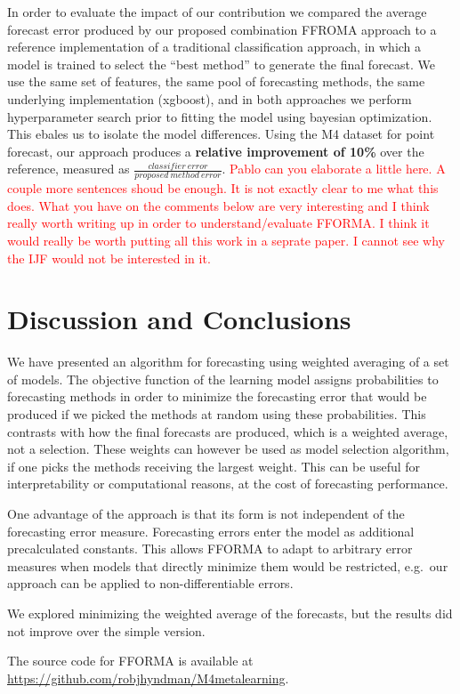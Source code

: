 \documentclass[11pt,a4paper,]{article}
\theoremstyle{definition}
\theoremstyle{definition}
\theoremstyle{definition}
\theoremstyle{remark}
\begin{document}
In order to evaluate the impact of our contribution we compared the
average forecast error produced by our proposed combination FFROMA
approach to a reference implementation of a traditional classification
approach, in which a model is trained to select the ``best method'' to
generate the final forecast. We use the same set of features, the same
pool of forecasting methods, the same underlying implementation
(xgboost), and in both approaches we perform hyperparameter search prior
to fitting the model using bayesian optimization. This ebales us to
isolate the model differences. Using the M4 dataset for point forecast,
our approach produces a \textbf{relative improvement of 10\%} over the
reference, measured as
\(\frac{classifier\ error}{proposed\ method\ error}\).
\textcolor{red}{Pablo can you elaborate a little here. A couple more sentences shoud be enough. It is not exactly clear to me what this does. What you have on the comments below are very interesting and I think really worth writing up in order to understand/evaluate FFORMA. I think it would really be worth putting all this work in a seprate paper. I cannot see why the IJF would not be interested in it.}

\section{Discussion and Conclusions}\label{conclusion}

We have presented an algorithm for forecasting using weighted averaging
of a set of models. The objective function of the learning model assigns
probabilities to forecasting methods in order to minimize the
forecasting error that would be produced if we picked the methods at
random using these probabilities. This contrasts with how the final
forecasts are produced, which is a weighted average, not a selection.
These weights can however be used as model selection algorithm, if one
picks the methods receiving the largest weight. This can be useful for
interpretability or computational reasons, at the cost of forecasting
performance.

One advantage of the approach is that its form is not independent of the
forecasting error measure. Forecasting errors enter the model as
additional precalculated constants. This allows FFORMA to adapt to
arbitrary error measures when models that directly minimize them would
be restricted, e.g.~our approach can be applied to non-differentiable
errors.

We explored minimizing the weighted average of the forecasts, but the
results did not improve over the simple version.

The source code for FFORMA is available at
\url{https://github.com/robjhyndman/M4metalearning}.

\printbibliography[title=References]
\end{document}
